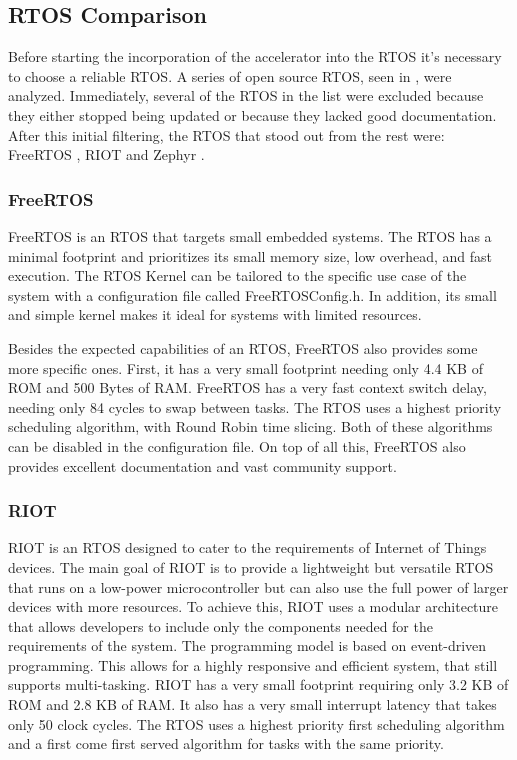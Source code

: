 \subsection{RTOS Comparison}
Before starting the incorporation of the accelerator into the RTOS it's necessary to choose a reliable RTOS. A series of open source RTOS, seen in \cite{RTOS_List}, were analyzed. Immediately, several of the RTOS in the list were excluded because they either stopped being updated or because they lacked good documentation. After this initial filtering, the RTOS that stood out from the rest were: FreeRTOS \cite{freeRTOS}, RIOT \cite{RIOT} and Zephyr \cite{zephyr}.

\subsubsection{FreeRTOS}
FreeRTOS is an RTOS that targets small embedded systems. The RTOS has a minimal footprint and prioritizes its small memory size, low overhead, and fast execution. The RTOS Kernel can be tailored to the specific use case of the system with a configuration file called FreeRTOSConfig.h. In addition, its small and simple kernel makes it ideal for systems with limited resources.

Besides the expected capabilities of an RTOS, FreeRTOS also provides some more specific ones. First, it has a very small footprint needing only 4.4 KB of ROM and 500 Bytes of RAM. FreeRTOS has a very fast context switch delay, needing only 84 cycles to swap between tasks. The RTOS uses a highest priority scheduling algorithm, with Round Robin time slicing. Both of these algorithms can be disabled in the configuration file. On top of all this, FreeRTOS also provides excellent documentation and vast community support.

\subsubsection{RIOT}
RIOT is an RTOS designed to cater to the requirements of Internet of Things devices. The main goal of RIOT is to provide a lightweight but versatile RTOS that runs on a low-power microcontroller but can also use the full power of larger devices with more resources. To achieve this, RIOT uses a modular architecture that allows developers to include only the components needed for the requirements of the system. The programming model is based on event-driven programming. This allows for a highly responsive and efficient system, that still supports multi-tasking. RIOT has a very small footprint requiring only 3.2 KB of ROM and 2.8 KB of RAM. It also has a very small interrupt latency that takes only 50 clock cycles. The RTOS uses a highest priority first scheduling algorithm and a first come first served algorithm for tasks with the same priority.

